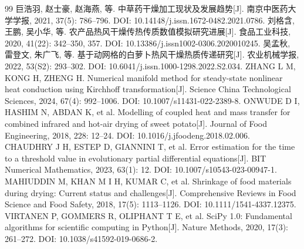 
\begin{thebibliography}{99}
 巨浩羽, 赵士豪, 赵海燕, 等. 中草药干燥加工现状及发展趋势[J]. 南京中医药大学学报, 2021, 37(5): 786--796. DOI: 10.14148/j.issn.1672-0482.2021.0786.
 刘格含, 王鹏, 吴小华, 等. 农产品热风干燥传热传质数值模拟研究进展[J]. 食品工业科技, 2020, 41(22): 342--350, 357. DOI: 10.13386/j.issn1002-0306.2020010245.
 吴孟秋, 雷登文, 朱广飞, 等. 基于动网格的白萝卜热风干燥热质传递研究[J]. 农业机械学报, 2022, 53(S2): 293--302. DOI: 10.6041/j.issn.1000-1298.2022.S2.034.
 ZHANG L M, KONG H, ZHENG H. Numerical manifold method for steady-state nonlinear heat conduction using Kirchhoff transformation[J]. Science China Technological Sciences, 2024, 67(4): 992--1006. DOI: 10.1007/s11431-022-2389-8.
 ONWUDE D I, HASHIM N, ABDAN K, et al. Modelling of coupled heat and mass transfer for combined infrared and hot-air drying of sweet potato[J]. Journal of Food Engineering, 2018, 228: 12--24. DOI: 10.1016/j.jfoodeng.2018.02.006.
 CHAUDHRY J H, ESTEP D, GIANNINI T, et al. Error estimation for the time to a threshold value in evolutionary partial differential equations[J]. BIT Numerical Mathematics, 2023, 63(1): 12. DOI: 10.1007/s10543-023-00947-1.
 MAHIUDDIN M, KHAN M I H, KUMAR C, et al. Shrinkage of food materials during drying: Current status and challenges[J]. Comprehensive Reviews in Food Science and Food Safety, 2018, 17(5): 1113--1126. DOI: 10.1111/1541-4337.12375.
 VIRTANEN P, GOMMERS R, OLIPHANT T E, et al. SciPy 1.0: Fundamental algorithms for scientific computing in Python[J]. Nature Methods, 2020, 17(3): 261--272. DOI: 10.1038/s41592-019-0686-2.
\end{thebibliography}
